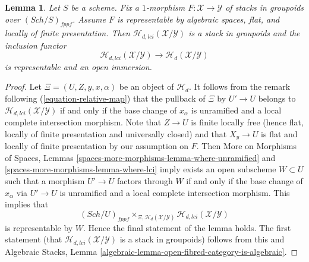 \documentclass{stacks-project}
\theoremstyle{plain}
\newtheorem{lemma}[subsection]{Lemma}
\theoremstyle{definition}
\theoremstyle{remark}
\numberwithin{equation}{subsection}
\def\Sch{\mathit{Sch}}
\begin{document}
\begin{lemma}
\label{lemma-lci-locus-stack-in-groupoids}
Let $S$ be a scheme. Fix a $1$-morphism
$F : \mathcal{X} \longrightarrow \mathcal{Y}$
of stacks in groupoids over $(\Sch/S)_{fppf}$.
Assume $F$ is representable by algebraic spaces, flat, and locally
of finite presentation. Then $\mathcal{H}_{d, lci}(\mathcal{X}/\mathcal{Y})$
is a stack in groupoids and the inclusion functor
$$
\mathcal{H}_{d, lci}(\mathcal{X}/\mathcal{Y})
\longrightarrow
\mathcal{H}_d(\mathcal{X}/\mathcal{Y})
$$
is representable and an open immersion.
\end{lemma}

\begin{proof}
Let $\Xi = (U, Z, y, x, \alpha)$ be an object of $\mathcal{H}_d$. It follows
from the remark following
(\ref{equation-relative-map})
that the pullback of $\Xi$ by $U' \to U$ belongs to
$\mathcal{H}_{d, lci}(\mathcal{X}/\mathcal{Y})$ if and only if the base
change of $x_\alpha$ is unramified and a local complete intersection morphism.
Note that $Z \to U$ is finite locally free (hence flat, locally of
finite presentation and universally closed) and that $X_y \to U$ is
flat and locally of finite presentation by our assumption on $F$. Then
More on Morphisms of Spaces, Lemmas
\ref{spaces-more-morphisms-lemma-where-unramified} and
\ref{spaces-more-morphisms-lemma-where-lci}
imply exists an open subscheme $W \subset U$ such that a morphism
$U' \to U$ factors through $W$ if and only if the base change of
$x_\alpha$ via $U' \to U$ is unramified and a local complete intersection
morphism. This implies that
$$
(\Sch/U)_{fppf}
\times_{\Xi, \mathcal{H}_d(\mathcal{X}/\mathcal{Y})}
\mathcal{H}_{d, lci}(\mathcal{X}/\mathcal{Y})
$$
is representable by $W$. Hence the final statement of the lemma
holds. The first statement (that
$\mathcal{H}_{d, lci}(\mathcal{X}/\mathcal{Y})$ is a stack in groupoids)
follows from this and
Algebraic Stacks,
Lemma \ref{algebraic-lemma-open-fibred-category-is-algebraic}.
\end{proof}
\end{document}
